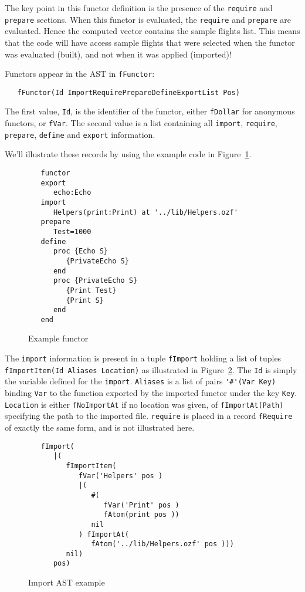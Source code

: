 \documentclass[a4paper]{memoir}
\begin{document}
The key point in this functor definition is the presence of the
\lstinline!require! and \lstinline!prepare! sections. When this functor is
evaluated, the \lstinline!require! and \lstinline!prepare! are evaluated.
Hence the computed vector contains the sample flights list.
This means that the code will have access sample flights that were selected when
the functor was evaluated (built), and not when it was applied (imported)!

Functors appear in the AST in \lstinline!fFunctor!:
\begin{lstlisting}
   fFunctor(Id ImportRequirePrepareDefineExportList Pos)
\end{lstlisting}
The first value, \lstinline!Id!, is the identifier of the functor, either
\lstinline!fDollar! for anonymous functors, or \lstinline!fVar!.
The second value is a list containing all \lstinline!import!,
\lstinline!require!, \lstinline!prepare!, \lstinline!define! and
\lstinline!export! information. 

We'll illustrate these records by using the example code in
Figure~\ref{fig:functor_example_code}.
\begin{figure}[ht]
\begin{lstlisting}
   functor
   export
      echo:Echo
   import
      Helpers(print:Print) at '../lib/Helpers.ozf'
   prepare
      Test=1000
   define
      proc {Echo S}
         {PrivateEcho S}
      end
      proc {PrivateEcho S}
         {Print Test}
         {Print S}
      end
   end
\end{lstlisting}
\caption{Example functor}
\label{fig:functor_example_code}
\end{figure}


The \lstinline!import! information is present in a tuple \lstinline!fImport!
holding a list of tuples \lstinline!fImportItem(Id Aliases Location)! as illustrated in
Figure~\ref{fig:functor_example_import}.
The \lstinline!Id! is simply the variable defined for the \lstinline!import!.
\lstinline!Aliases! is a list of pairs \lstinline!'#'(Var Key)! binding
\lstinline!Var! to the function exported by the imported functor under the key
\lstinline!Key!.
\lstinline!Location! is either \lstinline!fNoImportAt! if no location was given,
of \lstinline!fImportAt(Path)! specifying the path to the imported file.
\lstinline!require! is placed in a record \lstinline!fRequire! of exactly the same form, and is not illustrated here.

\begin{figure}[ht]
\begin{lstlisting}
   fImport(
      |(
         fImportItem(
            fVar('Helpers' pos )
            |(
               #(
                  fVar('Print' pos )
                  fAtom(print pos ))
               nil
            ) fImportAt(
               fAtom('../lib/Helpers.ozf' pos )))
         nil)
      pos)
\end{lstlisting}
\caption{Import AST example}
\label{fig:functor_example_import}
\end{figure}
\end{document}

